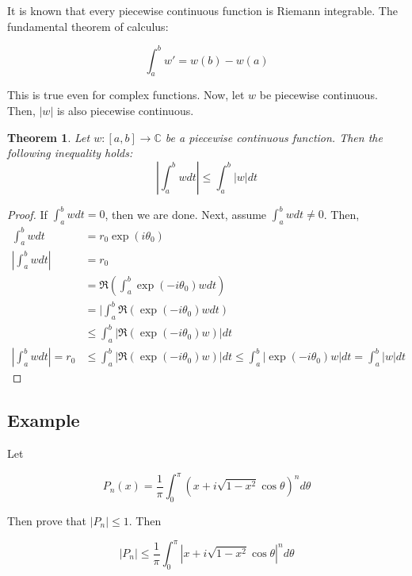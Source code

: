 \documentclass{article}
\newtheorem{theorem}{Theorem}[section]
\newtheorem{one minute paper}[theorem]{One Minute Paper}
\begin{document}
It is known that every piecewise continuous function is Riemann integrable. The fundamental theorem of calculus: 

\begin{equation}
    \int_a^b w' = w(b) - w(a)
\end{equation}

This is true even for complex functions. Now, let $w$ be piecewise continuous. Then, $|w|$ is also piecewise continuous. 

\begin{theorem}
    Let $w:[a,b] \to \mathbb{C}$ be a piecewise continuous function. Then the following inequality holds:
    \begin{equation}
        |\int_a^b w dt | \leq \int_a^b |w| dt
    \end{equation}
\end{theorem}

\begin{proof}
    If $\int_a^bwdt = 0$, then we are done. Next, assume $\int_a^b w dt \neq 0$. Then, 
    \begin{align}
        \int_a^b w dt &= r_0 \exp(i\theta_0)\\
        |\int_a^b w dt| &= r_0 \\
        &= \Re\left( \int_a^b \exp(-i\theta_0)wdt \right)\\
        &= |\int_a^b \Re(\exp(-i\theta_0)w dt) \\
        &\leq \int_a^b |\Re(\exp(-i\theta_0)w)|dt \\
        |\int_a^b w dt| = r_0 &\leq \int_a^b |\Re(\exp(-i\theta_0)w)|dt \leq \int_a^b |\exp(-i\theta_0)w|dt = \int_a^b |w| dt
    \end{align}
\end{proof}

\subsection*{Example}

Let 

\begin{equation}
    P_n(x) = \frac{1}{\pi}\int_0^\pi (x + i\sqrt{1 - x^2}\cos\theta)^n d\theta
\end{equation}

Then prove that $|P_n| \leq 1$. Then 

\begin{equation}
    |P_n| \leq \frac{1}{\pi}\int_0^\pi|x + i\sqrt{1-x^2}\cos\theta|^n d\theta
\end{equation}
\end{document}
